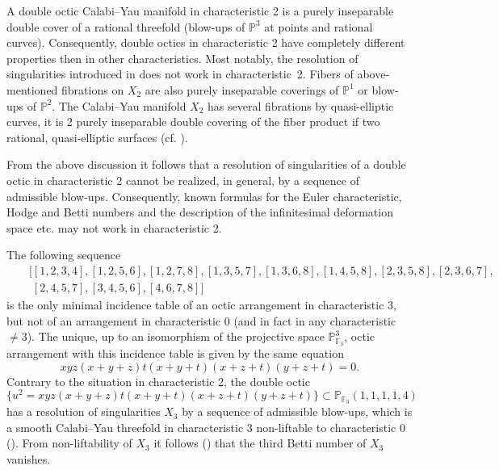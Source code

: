 \documentclass[12pt]{amsart}
\theoremstyle{plain}
\theoremstyle{remark}
\theoremstyle{definition}
\newcommand{\PP}{\mathbb P}
\numberwithin{table}{section}
\begin{document}
A double octic Calabi--Yau manifold in characteristic 2 is a purely inseparable double cover of a rational threefold (blow-ups of $\PP^{3}$ at points and rational curves). Consequently, double octics in characteristic 2 have completely different properties then in other characteristics. Most notably, the resolution of singularities introduced in \cite{CScvS} does not work in characteristic~2. Fibers of above-mentioned fibrations on $X_{2}$ are also purely inseparable coverings of $\PP^{1}$ or blow-ups of $\PP^{2}$. The Calabi--Yau manifold $X_{2}$ has several fibrations by quasi-elliptic curves, it is 2 purely inseparable double covering of the fiber product if two rational, quasi-elliptic surfaces (cf. \cite{Hirokado2}).

From the above discussion it follows that a resolution of singularities of a double octic in characteristic 2 cannot be realized, in general,  by a sequence of admissible blow-ups. Consequently, known formulas for the Euler characteristic, Hodge and Betti numbers and the description of the infinitesimal deformation space etc. may not work in characteristic 2.


The following sequence
\begin{eqnarray*}
	&&[[1,2,3,4],
	[1,2,5,6],
	[1,2,7,8],
	[1,3,5,7],
	[1,3,6,8],
	[1,4,5,8],
	[2,3,5,8],
	[2,3,6,7],\\
	&&\phantom{[}[2,4,5,7],
	[3,4,5,6],
	[4,6,7,8]]
\end{eqnarray*}
is the only minimal incidence table of an octic arrangement in characteristic 3, but not of an arrangement in characteristic 0 (and in fact in any characteristic $\not=3$). The unique, up to an isomorphism of the projective space $\PP_{\mathbb F_{3}}^{3}$, octic arrangement with this incidence table is given by the same equation
\[xyz(x+y+z)t(x+y+t)(x+z+t)(y+z+t)=0.\]
Contrary to the situation in characteristic 2, the double octic
\[\{u^{2} = xyz(x+y+z)t(x+y+t)(x+z+t)(y+z+t)\}\subset \PP_{\mathbb F_{3}}(1,1,1,1,4)\]
has a resolution of singularities $X_{3}$ by a sequence of admissible blow-ups, which is a smooth Calabi--Yau threefold in characteristic 3 non-liftable to characteristic 0 (\cite{CvS3}).
From non-liftability of $X_{3}$ it follows (\cite{Lam}) that the third Betti number of $X_{3}$ vanishes.
\end{document}
